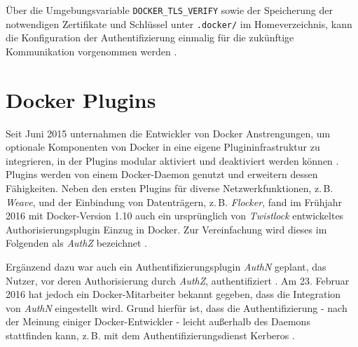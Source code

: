 \documentclass[../main.tex]{subfiles}
\begin{document}
    Über die Umgebungsvariable \texttt{DOCKER\_TLS\_VERIFY} sowie der Speicherung der notwendigen Zertifikate und Schlüssel unter \texttt{.docker/} im Homeverzeichnis, kann die Konfiguration der Authentifizierung einmalig für die zukünftige Kommunikation vorgenommen werden \cite{dockerSecurityHTTPS}.




  \section{Docker Plugins}
  \label{plugins}
    Seit Juni 2015 unternahmen die Entwickler von Docker Anstrengungen, um optionale Komponenten von Docker in eine eigene Plugininfrastruktur zu integrieren, in der Plugins modular aktiviert und deaktiviert werden können \cite{githubDockerChangelog}\cite{dockerPlugins}. Plugins werden von einem Docker-Daemon genutzt und erweitern dessen Fähigkeiten. Neben den ersten Plugins für diverse Netzwerkfunktionen, z.\,B. \emph{Weave}, und der Einbindung von Datenträgern, z.\,B. \emph{Flocker}, fand im Frühjahr 2016 mit Docker-Version 1.10 auch ein ursprünglich von \emph{Twistlock}\cite{twistlock} entwickeltes Authorisierungsplugin Einzug in Docker. Zur Vereinfachung wird dieses im Folgenden als \emph{AuthZ} bezeichnet \cite{githubPluginList}\cite{dockerPlugins}\cite{authzTwistlock}.

    Ergänzend dazu war auch ein Authentifizierungsplugin \emph{AuthN} geplant, das Nutzer, vor deren Authorisierung durch \emph{AuthZ}, authentifiziert \cite{githubAuthZDockerAccessControl}. Am 23. Februar 2016 hat jedoch ein Docker-Mitarbeiter bekannt gegeben, dass die Integration von \emph{AuthN} eingestellt wird. Grund hierfür ist, dass die Authentifizierung - nach der Meinung einiger Docker-Entwickler - leicht außerhalb des Daemons stattfinden kann, z.\,B. mit dem Authentifizierungsdienst Kerberos \cite{kerberos}\cite{githubAuthZKerberosSupport}\cite{githubAuthNLaydown}.
\end{document}
